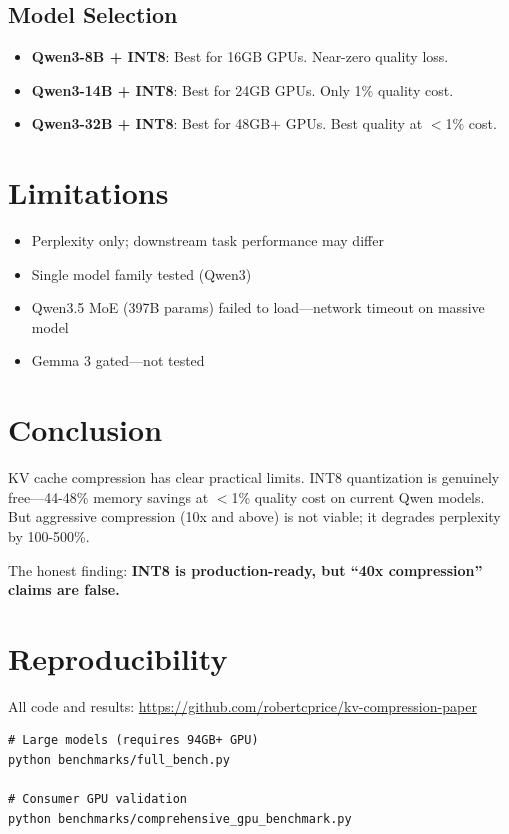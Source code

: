 \documentclass[11pt]{article}
\begin{document}
\subsection{Model Selection}

\begin{itemize}
    \item \textbf{Qwen3-8B + INT8}: Best for 16GB GPUs. Near-zero quality loss.
    \item \textbf{Qwen3-14B + INT8}: Best for 24GB GPUs. Only 1\% quality cost.
    \item \textbf{Qwen3-32B + INT8}: Best for 48GB+ GPUs. Best quality at $<$1\% cost.
\end{itemize}

\section{Limitations}

\begin{itemize}
    \item Perplexity only; downstream task performance may differ
    \item Single model family tested (Qwen3)
    \item Qwen3.5 MoE (397B params) failed to load—network timeout on massive model
    \item Gemma 3 gated—not tested
\end{itemize}

\section{Conclusion}

KV cache compression has clear practical limits. INT8 quantization is genuinely free—44-48\% memory savings at $<$1\% quality cost on current Qwen models. But aggressive compression (10x and above) is not viable; it degrades perplexity by 100-500\%.

The honest finding: \textbf{INT8 is production-ready, but ``40x compression'' claims are false.}

\section*{Reproducibility}

All code and results: \url{https://github.com/robertcprice/kv-compression-paper}

\begin{verbatim}
# Large models (requires 94GB+ GPU)
python benchmarks/full_bench.py

# Consumer GPU validation
python benchmarks/comprehensive_gpu_benchmark.py
\end{verbatim}
\end{document}

